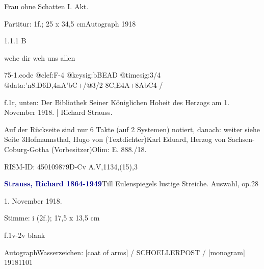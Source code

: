 \documentclass[a4paper, twocolumn, 11pt]{book}
\begin{document}
\par \begin{itshape} Frau ohne Schatten I. Akt.\end{itshape} 
\par \textcolor{darkblue}{}  Partitur: 1f.; 25 x 34,5 cm\newline Autograph  1918
\par 1.1.1  B\newline \begin{footnotesize} wehe dir weh uns allen \end{footnotesize}  
\begin{filecontents*}{75-1.code}
@clef:F-4
@keysig:bBEAD
@timesig:3/4
@data:'n8.D6D,4nA'bC+/@3/2 8C,E4A+8AbC4-/
\end{filecontents*}
\newline %
\par f.1r, unten: {\textquotedbl}Der Bibliothek Seiner Königlichen Hoheit des Herzogs am 1. November 1918. | Richard Strauss.{\textquotedbl}
\par Auf der Rückseite sind nur 6 Takte (auf 2 Systemen) notiert, danach: {\textquotedbl}weiter siehe Seite 3{\textquotedbl}\newline Hofmannsthal, Hugo von  (Textdichter)\newline Karl Eduard, Herzog von Sachsen-Coburg-Gotha  (Vorbesitzer)\newline Olim: E. 888./18.
\par RISM-ID: 450109879\newline D-Cv  A.V,1134,(15),3
\par \vspace{16pt} \textcolor{darkblue}{\textbf{Strauss, Richard  1864-1949}}\hfillplus{[76]}\newline Till Eulenspiegels lustige Streiche. Auswahl, op.28
\par \begin{itshape}[heading:] 1. November 1918.\end{itshape} 
\par \textcolor{darkblue}{}  Stimme: i  (2f.); 17,5 x 13,5 cm\newline \begin{small} f.1v-2v blank\end{small} \newline Autograph\newline Wasserzeichen: [coat of arms] / SCHOELLERPOST / [monogram]  19181101
\end{document}
